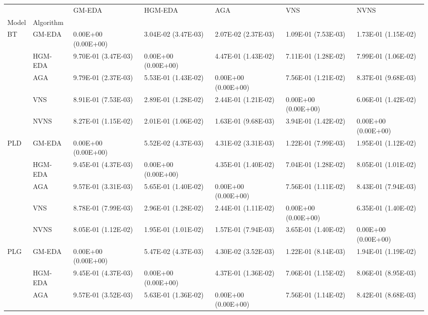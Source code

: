 \begin{tabular}{lllllll}
\toprule
   &      &               GM-EDA &              HGM-EDA &                  AGA &                  VNS &                 NVNS \\
Model & Algorithm &                      &                      &                      &                      &                      \\
\midrule
BT & GM-EDA &  0.00E+00 (0.00E+00) &  3.04E-02 (3.47E-03) &  2.07E-02 (2.37E-03) &  1.09E-01 (7.53E-03) &  1.73E-01 (1.15E-02) \\
   & HGM-EDA &  9.70E-01 (3.47E-03) &  0.00E+00 (0.00E+00) &  4.47E-01 (1.43E-02) &  7.11E-01 (1.28E-02) &  7.99E-01 (1.06E-02) \\
   & AGA &  9.79E-01 (2.37E-03) &  5.53E-01 (1.43E-02) &  0.00E+00 (0.00E+00) &  7.56E-01 (1.21E-02) &  8.37E-01 (9.68E-03) \\
   & VNS &  8.91E-01 (7.53E-03) &  2.89E-01 (1.28E-02) &  2.44E-01 (1.21E-02) &  0.00E+00 (0.00E+00) &  6.06E-01 (1.42E-02) \\
   & NVNS &  8.27E-01 (1.15E-02) &  2.01E-01 (1.06E-02) &  1.63E-01 (9.68E-03) &  3.94E-01 (1.42E-02) &  0.00E+00 (0.00E+00) \\
PLD & GM-EDA &  0.00E+00 (0.00E+00) &  5.52E-02 (4.37E-03) &  4.31E-02 (3.31E-03) &  1.22E-01 (7.99E-03) &  1.95E-01 (1.12E-02) \\
   & HGM-EDA &  9.45E-01 (4.37E-03) &  0.00E+00 (0.00E+00) &  4.35E-01 (1.40E-02) &  7.04E-01 (1.28E-02) &  8.05E-01 (1.01E-02) \\
   & AGA &  9.57E-01 (3.31E-03) &  5.65E-01 (1.40E-02) &  0.00E+00 (0.00E+00) &  7.56E-01 (1.11E-02) &  8.43E-01 (7.94E-03) \\
   & VNS &  8.78E-01 (7.99E-03) &  2.96E-01 (1.28E-02) &  2.44E-01 (1.11E-02) &  0.00E+00 (0.00E+00) &  6.35E-01 (1.40E-02) \\
   & NVNS &  8.05E-01 (1.12E-02) &  1.95E-01 (1.01E-02) &  1.57E-01 (7.94E-03) &  3.65E-01 (1.40E-02) &  0.00E+00 (0.00E+00) \\
PLG & GM-EDA &  0.00E+00 (0.00E+00) &  5.47E-02 (4.37E-03) &  4.30E-02 (3.52E-03) &  1.22E-01 (8.14E-03) &  1.94E-01 (1.19E-02) \\
   & HGM-EDA &  9.45E-01 (4.37E-03) &  0.00E+00 (0.00E+00) &  4.37E-01 (1.36E-02) &  7.06E-01 (1.15E-02) &  8.06E-01 (8.95E-03) \\
   & AGA &  9.57E-01 (3.52E-03) &  5.63E-01 (1.36E-02) &  0.00E+00 (0.00E+00) &  7.56E-01 (1.14E-02) &  8.42E-01 (8.68E-03) \\

\end{tabular}
